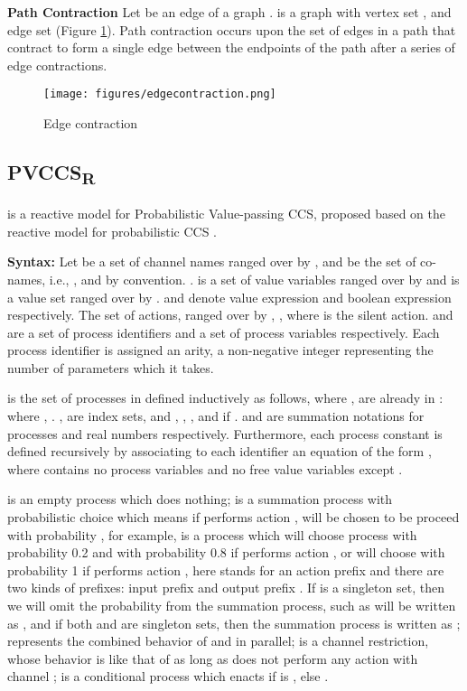 \documentclass{acm_proc_article-sp}
\begin{document}
\textbf{Path Contraction}
Let  be an edge of a graph .  is a graph  with vertex set , and edge set  (Figure \ref{edgecontraction}). Path contraction occurs upon the set of edges in a path that contract to form a single edge between the endpoints of the path after a series of edge contractions.
\begin{figure}[htpb]
\begin{center}
\texttt{[image: figures/edgecontraction.png]}
\caption{Edge contraction}
\label{edgecontraction}
\end{center}
\end{figure}
\subsection{PVCCS\textsubscript{R}}
\newtheorem{definition}{Definition}[section]
\newtheorem{Theorem}{Theorem}[section]
\newtheorem{Lemma}{Lemma}[section]
 is a reactive model for Probabilistic Value-passing CCS, proposed based on the reactive model for probabilistic CCS \cite{rob}.

\textbf{Syntax:}
Let  be a set of channel names ranged over by , and  be the set of co-names, i.e., , and  by convention. .  is a set of value variables ranged over by  and  is a value set ranged over by .  and  denote value expression and boolean expression respectively. The set of actions, ranged over by , ,  where  is the silent action.  and  are a set of process identifiers and a set of process variables respectively. Each process identifier  is assigned an arity, a non-negative integer representing the number of parameters which it takes.

 is the set of processes in  defined inductively as follows, where ,  are already in :\\

where , . ,  are index sets, and , , , and  if .  and  are summation notations for processes and real numbers respectively. Furthermore, each process constant  is defined recursively by associating to each identifier an equation of the form , where  contains no process variables and no free value variables except .

 is an empty process which does nothing;  is a summation process with probabilistic choice which means if performs action ,  will be chosen to be proceed with probability , for example,  is a process which will choose process  with probability 0.2 and  with probability 0.8 if performs action , or will choose  with probability 1 if performs action , here  stands for an action prefix and there are two kinds of prefixes: input prefix  and output prefix . If  is a singleton set, then we will omit the probability from the summation process, such as  will be written as , and if both  and  are singleton sets, then the summation process is written as ;  represents the combined behavior of  and  in parallel;  is a channel restriction, whose behavior is like that of  as long as  does not perform any action with channel ;
 is a conditional process which enacts  if  is , else .
\end{document}
